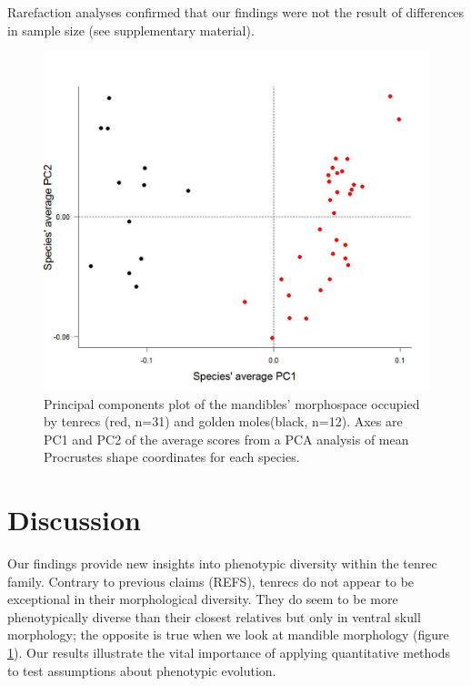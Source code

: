 \documentclass[12pt,a4paper]{article}
\begin{document}
Rarefaction analyses confirmed that our findings were not the result of differences in sample size (see supplementary material).


\begin{figure}[H]
\centering
\includegraphics[width=1\linewidth]{Mands_Tenrecs+Gmoles_PC1PC2_01_05_14.jpg}
\caption{Principal components plot of the mandibles' morphospace occupied by tenrecs (red, n=31) and golden moles(black, n=12). Axes are PC1 and PC2 of the average scores from a PCA analysis of mean Procrustes shape coordinates for each species. }
\label{mandsPCA}

\end{figure}



\section{Discussion} %

Our findings provide new insights into phenotypic diversity within the tenrec family. Contrary to previous claims (REFS), tenrecs do not appear to be exceptional in their morphological diversity. They do seem to be more phenotypically diverse than their closest relatives but only in ventral skull morphology; the opposite is true when we look at mandible morphology (figure \ref{mandsPCA}). Our results illustrate the vital importance of applying quantitative methods to test assumptions about phenotypic evolution. %
\end{document}
